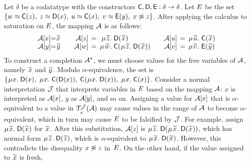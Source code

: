 \begin{examplex}
Let $\delta$ be a codatatype with the constructors $\textsf{C}, \textsf{D}, \textsf{E} :\delta \rightarrow \delta$.
Let $E$ be the set
$\{
w \approx \textsf{C}( z ),\;
z \approx \textsf{D}( x ),\;
u \approx \textsf{C}( x ),\;
v \approx \textsf{E}( y ),\;
x \not\approx z
\}$.
After applying the calculus to saturation on $E$, the mapping $\mathcal{A}$ is as follows:
\[\begin{array}{r@{}c@{}r@{\qquad}r@{}c@{}r@{\;}l@{}l@{\;}l@{\qquad}r@{}c@{}l@{\;}l}
\Val \ec{x} & = & {\Varec{x}} &
\Val \ec{z} & = & \MU {\Varec{z}}. & \multicolumn{2}{@{}l@{}}{\const{D}( {\Varec{x}} )} & &
\Val \ec{u} & {}\,=\,{} & \MU {\Varec{u}}. & \const{C}( {\Varec{x}} ) \\
\Val \ec{y} & = & {\Varec{y}} &
\Val \ec{w} & {}\,=\,{} & \MU {\Varec{w}}. & \const{C}( & \MU {\Varec{z}}. & \const{D}( {\Varec{x}} ) ) &
\Val \ec{v} & = & \MU {\Varec{v}}. & \const{E}( {\Varec{y}} )
\end{array}\]
%
To construct a completion $\mathcal{A}^\star$, we must choose values for the free
variables of $\mathcal{A}$, namely ${\Varec{x}}$ and ${\Varec{y}}$.
Modulo $\alpha$-equivalence, the set  is
$%
\{
\MU x.\; \const{D}( x ),\;
\MU x.\; \const{C}( \const{D}( x )),\allowbreak\;
\const{C}( \MU x.\; \const{D}( x )),\;
\MU x.\; \const{C}( x )
\}
$.
Consider a normal interpretation $\mathcal{J}$ that interprets variables in $E$ based on the mapping $\mathcal{A}$:
$x$ is interpreted as $\mathcal{A} [x]$, $y$ as $\mathcal{A} [y]$, and so on.
Assigning a value for $\mathcal{A} [x]$ that is $\alpha$-equivalent to a value in $\mathcal{T}^{\smash{\J}}_{{\Varec{x}}}( \Val )$
may cause values in the range of $\mathcal{A}$ to become $\alpha$-equivalent,
which in turn may cause $E$ to be falsified by $\mathcal{J}$.
For example, assign $\MU {\Varec{x}}.\; \const{D}( {\Varec{x}} )$ for ${\Varec{x}}$.
After this substitution, $\mathcal{A} [z]$ is $\MU {\Varec{z}}.\; \const{D}( \MU {\Varec{x}}.\; \const{D}( {\Varec{x}} ) )$,
which has normal form $\MU {\Varec{z}}.\; \const{D}( {\Varec{z}} )$,
which is $\alpha$-equivalent to $\MU {\Varec{x}}.\; \const{D}( {\Varec{x}} )$.
However, this contradicts the disequality $x \not\approx z$ in~$E$.
On the other hand, if the value assigned to ${\Varec{x}}$ is fresh, %

\end{examplex}
